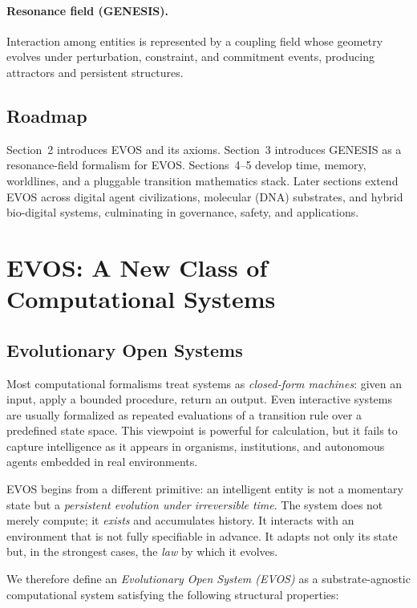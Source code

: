 \documentclass[11pt]{article}
\begin{document}
\paragraph{Resonance field (GENESIS).}
Interaction among entities is represented by a coupling field whose geometry evolves
under perturbation, constraint, and commitment events, producing attractors and
persistent structures.

\vspace{0.75em}
\subsection{Roadmap}

Section~2 introduces EVOS and its axioms.
Section~3 introduces GENESIS as a resonance-field formalism for EVOS.
Sections~4--5 develop time, memory, worldlines, and a pluggable transition mathematics
stack.
Later sections extend EVOS across digital agent civilizations, molecular (DNA) substrates,
and hybrid bio-digital systems, culminating in governance, safety, and applications.

\vspace{0.75em}
\section{EVOS: A New Class of Computational Systems}

\subsection{Evolutionary Open Systems}

Most computational formalisms treat systems as \emph{closed-form machines}: given an input,
apply a bounded procedure, return an output. Even interactive systems are usually formalized
as repeated evaluations of a transition rule over a predefined state space. This viewpoint
is powerful for calculation, but it fails to capture intelligence as it appears in
organisms, institutions, and autonomous agents embedded in real environments.

EVOS begins from a different primitive: an intelligent entity is not a momentary state but
a \emph{persistent evolution under irreversible time}. The system does not merely compute;
it \emph{exists} and accumulates history. It interacts with an environment that is not fully
specifiable in advance. It adapts not only its state but, in the strongest cases, the
\emph{law} by which it evolves.

We therefore define an \emph{Evolutionary Open System (EVOS)} as a substrate-agnostic
computational system satisfying the following structural properties:
\end{document}
